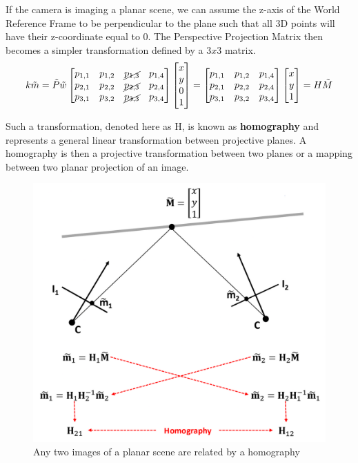 \documentclass{article}
\begin{document}
If the camera is imaging a planar scene, we can assume the z-axis of the World Reference Frame to be perpendicular to the plane such that all 3D points will have their z-coordinate equal to 0.
The Perspective Projection Matrix then becomes a simpler transformation defined by a $3x3$ matrix.
$$k\tilde{m} = \tilde{P}\tilde{w}
\begin{bmatrix}
  p_{1,1} & p_{1,2} & \cancel{p_{1,3}} & p_{1,4} \\
  p_{2,1} & p_{2,2} & \cancel{p_{2,3}} & p_{2,4} \\
  p_{3,1} & p_{3,2} & \cancel{p_{3,3}} & p_{3,4} 
\end{bmatrix}
\begin{bmatrix}
x \\ y \\ 0 \\ 1
\end{bmatrix}
=
\begin{bmatrix}
  p_{1,1} & p_{1,2} & p_{1,4} \\
  p_{2,1} & p_{2,2} & p_{2,4} \\
  p_{3,1} & p_{3,2} & p_{3,4} 
\end{bmatrix}
\begin{bmatrix}
x \\ y \\ 1
\end{bmatrix}
= H\tilde{M}
$$

Such a transformation, denoted here as H, is known as \textbf{homography} and represents a general linear transformation between projective planes.
A homography is then a projective transformation between two planes or a mapping between two planar projection of an image.

\begin{figure}[htbp]
  \centering
  \includegraphics[width=0.6\linewidth]{./img/homography.jpg}
  \caption{Any two images of a planar scene are related by a homography}
  \label{fig:homography}
\end{figure}
\end{document}
